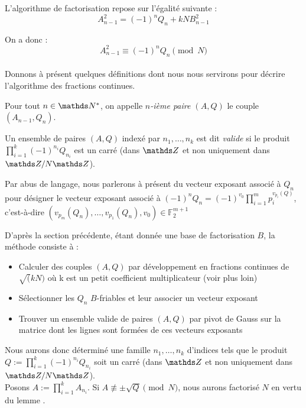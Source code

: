 L'algorithme de factorisation repose sur l'égalité suivante : \[ A_{n-1}^2 = 
(-1)^n Q_n + kN B_{n-1}^2 \]

On a donc : \[ A_{n-1}^2 \equiv (-1)^n Q_n \pmod{N} \] \\


Donnons à présent quelques définitions dont nous nous servirons pour décrire 
l'algorithme des fractions continues. 

\begin{definition}
	Pour tout $n\in \N^*$, on appelle \emph{$n$-ième paire $(A, Q)$} le couple
	$(A_{n-1}, Q_n)$.
\end{definition}

\begin{definition}
	Un ensemble de paires $(A, Q)$ indexé par $n_1, \dots, n_k$ est dit
	\emph{valide} si le produit $\prod_{i=1}^k (-1)^{n_i} Q_{n_i}$ est un carré
	(dans $\Z$ et non uniquement dans $\Z/N\Z$).
\end{definition}

\begin{remarque}
    Par abus de langage, nous parlerons à présent du vecteur exposant 
    associé à $Q_n$ pour désigner le vecteur exposant associé à 
    $(-1)^n Q_n = (-1)^{v_0} \prod_{i=1}^m p_i^{v_{p_i}(Q)}$,
    c'est-à-dire $(v_{p_m}(Q_n),\dots, v_{p_1}(Q_n), v_0 ) \in \mathbb{F}_2^{m+1}$
\end{remarque}

D'après la section précédente, étant donnée une base de factorisation $B$,
la méthode consiste à : 

\begin{itemize}
    \item Calculer des couples $(A,Q)$ par développement en fractions continues 
        de $\sqrt(kN)$ où k est un petit coefficient multiplicateur (voir plus loin)
    \item Sélectionner les $Q_n$ $B$-friables et leur associer un vecteur exposant
    \item Trouver un ensemble valide de paires $(A, Q)$ par pivot de Gauss 
          sur la matrice dont les lignes sont formées de ces vecteurs exposants
\end{itemize}

Nous aurons donc déterminé une famille $n_1,\dots, n_k$ d'indices tels que le 
produit $Q:=\prod_{i=1}^k (-1)^{n_i} Q_{n_i}$ soit un carré (dans $\Z$ et non 
uniquement dans $\Z/N\Z$). \\
Posons $A := \prod_{i=1}^k A_{n_i}$. Si $A\not\equiv \pm  \sqrt{Q}\pmod{N}$, 
nous aurons factorisé $N$ en vertu du lemme
.\\

